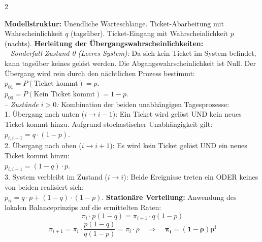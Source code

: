 \documentclass[a4paper, 9pt]{extarticle}
\begin{document}
\begin{multicols*}{2}
\begin{tcolorbox}[title={IT-Helpdesk Warteschlange (Aufgabe 4)}, colframe=markovviolet, colback=markovviolet!5, colbacktitle=markovviolet]
\textbf{Modellstruktur:} Unendliche Warteschlange. Ticket-Abarbeitung mit Wahrscheinlichkeit $q$ (tagsüber). Ticket-Eingang mit Wahrscheinlichkeit $p$ (nachts).
\smallskip
\textbf{Herleitung der Übergangswahrscheinlichkeiten:}
\\-- \textit{Sonderfall Zustand 0 (Leeres System):} Da sich kein Ticket im System befindet, kann tagsüber keines gelöst werden. Die Abgangswahrscheinlichkeit ist Null. Der Übergang wird rein durch den nächtlichen Prozess bestimmt:
\\$p_{01} = P(\text{Ticket kommt}) = p$.
\\$p_{00} = P(\text{Kein Ticket kommt}) = 1-p$.
\\-- \textit{Zustände $i > 0$:} Kombination der beiden unabhängigen Tagesprozesse:
\\1. Übergang nach unten ($i \rightarrow i-1$): Ein Ticket wird gelöst UND kein neues Ticket kommt hinzu. Aufgrund stochastischer Unabhängigkeit gilt:
\\$p_{i,i-1} = q \cdot (1-p)$.
\\2. Übergang nach oben ($i \rightarrow i+1$): Es wird kein Ticket gelöst UND ein neues Ticket kommt hinzu:
\\$p_{i,i+1} = (1-q) \cdot p$.
\\3. System verbleibt im Zustand ($i \rightarrow i$): Beide Ereignisse treten ein ODER keines von beiden realisiert sich:
\\$p_{ii} = q \cdot p + (1-q) \cdot (1-p)$.
\smallskip
\textbf{Stationäre Verteilung:}
Anwendung des lokalen Balanceprinzips auf die ermittelten Raten:
$$\pi_i \cdot p(1-q) = \pi_{i+1} \cdot q(1-p)$$
$$\pi_{i+1} = \pi_i \cdot \frac{p(1-q)}{q(1-p)} = \pi_i \cdot \rho \quad \Rightarrow \quad \bm{\pi_i = (1-\rho)\rho^i}$$
\end{tcolorbox}


\end{multicols*}
\end{document}
